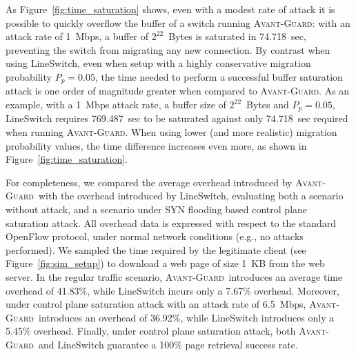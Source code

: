 \documentclass{sig-alternate}
\newcommand{\avantguard}{\textsc{Avant-Guard}}
\begin{document}
As Figure~\ref{fig:time_saturation} shows, even with a modest rate of attack it is possible to quickly overflow the buffer of a switch running \avantguard: with an attack rate of 1~Mbps, a buffer of $2^{22}$~Bytes is saturated in 74.718~sec, preventing the switch from migrating any new connection.
By contrast when using LineSwitch, even when setup with a highly conservative migration probability $P_p=0.05$, the time needed to perform a successful buffer saturation attack is one order of magnitude greater when compared to \avantguard. 
As an example, with a 1~Mbps attack rate, a buffer size of $2^{22}$~Bytes and $P_p=0.05$, LineSwitch requires 769.487~sec to be saturated against only 74.718~sec required when running \avantguard. 
When using lower (and more realistic) migration probability values, the time difference increases even more, as shown in Figure~\ref{fig:time_saturation}.
 
For completeness, we compared the average overhead introduced by \avantguard~with the overhead introduced by LineSwitch, evaluating both a scenario without attack, and a scenario under SYN flooding based control plane saturation attack.
All overhead data is expressed with respect to the standard OpenFlow protocol, under normal network conditions (e.g., no attacks performed).
We sampled the time required by the legitimate client (see Figure~\ref{fig:sim_setup}) to download a web page of size 1~KB from the web server. 
In the regular traffic scenario, \avantguard~introduces an average time overhead of 41.83\%, while LineSwitch incurs only a 7.67\% overhead. Moreover, under control plane saturation attack with an attack rate of 6.5~Mbps, \avantguard~introduces an overhead of 36.92\%, while LineSwitch introduces only a 5.45\% overhead. 
Finally, under control plane saturation attack, both \avantguard~and LineSwitch guarantee a 100\% page retrieval success rate.
\end{document}
